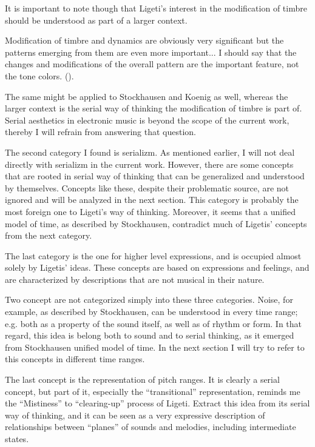 \documentclass[a4paper,11pt]{article}
\newenvironment{MyShadequote}[1][]{%
    \ignorespaces%
    \begin{mdframed}[style=MyShadeQuoteStyle,#1]%
}{%
    \end{mdframed}%
    \ignorespacesafterend%
}%
\begin{document}
It is important to note though that Ligeti's interest in the modification of timbre should be understood as part of a larger context.

\begin{MyShadequote}
  Modification of timbre and dynamics are obviously very significant but the patterns emerging from them are even more important...
  I should say that the changes and modifications of the overall pattern are the important feature, not the tone colors. (\cite[p. 39]{varnai}).
\end{MyShadequote}

The same might be applied to Stockhausen and Koenig as well, whereas the larger context is the serial way of thinking the modification of timbre is part of.
Serial aesthetics in electronic music is beyond the scope of the current work, thereby I will refrain from answering that question.

The second category I found is serializm.
As mentioned earlier, I will not deal directly with serializm in the current work.
However, there are some concepts that are rooted in serial way of thinking that can be generalized and understood by themselves.
Concepts like these, despite their problematic source, are not ignored and will be analyzed in the next section.
This category is probably the most foreign one to Ligeti's way of thinking.
Moreover, it seems that a unified model of time, as described by Stockhausen, contradict much of Ligetis' concepts from the next category.

The last category is the one for higher level expressions, and is occupied almost solely by Ligetis' ideas.
These concepts are based on expressions and feelings, and are characterized by descriptions that are not musical in their nature.

Two concept are not categorized simply into these three categories.
Noise, for example, as described by Stockhausen, can be understood in every time range;
e.g. both as a property of the sound itself, as well as of rhythm or form.
In that regard, this idea is belong both to sound and to serial thinking, as it emerged from Stockhausen unified model of time.
In the next section I will try to refer to this concepts in different time ranges.

The last concept is the representation of pitch ranges.
It is clearly a serial concept, but part of it, especially the ``transitional'' representation, reminds me the ``Mistiness'' to ``clearing-up'' process of Ligeti.
Extract this idea from its serial way of thinking, and it can be seen as a very expressive description of relationships between ``planes'' of sounds and melodies, including intermediate states.
\end{document}
